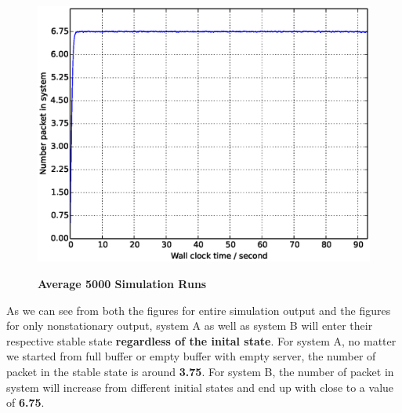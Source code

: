 \documentclass[12pt]{article}  %
\theoremstyle{definition}
\theoremstyle{remark}
\begin{document}
\begin{figure}
{        \includegraphics[scale=0.4]{Lmda10Init0Avg5000.eps}
        \label{fig:systemB:init0:all}
}
\hfill
{}
\caption{\textbf{Average 5000 Simulation Runs}}
\end{figure}

As we can see from both the figures for entire simulation output and the figures for only nonstationary output, system A as well as system B will enter their respective stable state \textbf{regardless of the inital state}.
For system A, no matter we started from full buffer or empty buffer with empty server, the number of packet in the stable state is around \textbf{3.75}.
For system B, the number of packet in system will increase from different initial states and end up with close to a value of \textbf{6.75}.
\end{document}
